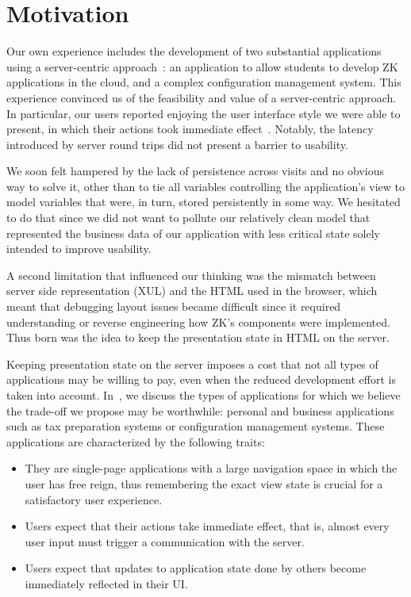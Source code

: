 \section{Motivation}
\label{sec:moti}

Our own experience includes the development of two substantial applications
using a server-centric approach~\cite{tilothesis,EdwardsBack:csc2011}:
an application to allow students to develop ZK applications in the cloud, and
a complex configuration management system.  This experience convinced
us of the feasibility and value of a server-centric approach.  In particular,
our users reported enjoying the user interface style we were able to
present, in which their actions took immediate effect~\cite{BaileyBack:igi2013}.
Notably, the latency introduced by server round trips did not present a
barrier to usability.

We soon felt hampered by the lack of persistence across visits and no obvious way 
to solve it, other than to tie all variables controlling the application's
view to model variables that were, in turn, stored persistently in some way.
We hesitated to do that since we did not want to pollute our relatively clean
model that represented the business data of our application with less 
critical state solely intended to improve usability.

A second limitation that influenced our thinking was the mismatch between
server side representation (XUL) and the HTML used in the browser, which meant
that debugging layout issues became difficult since it required understanding
or reverse engineering how ZK's components were implemented.
Thus born was the idea to keep the presentation state in HTML on the server.

Keeping presentation state on the server imposes a cost that not all
types of applications may be willing to pay, even when the reduced development
effort is taken into account.  In~\cite{mcdaniel2012cloudbrowser}, we
discuss the types of applications for which we believe the trade-off we propose
may be worthwhile: personal and business applications such as tax preparation systems
or configuration management systems.  These applications are characterized by the following
traits:
\begin{itemize}
\item They are single-page applications with a large navigation space in which the
    user has free reign, thus remembering the exact view state is crucial for
    a satisfactory user experience.
\item Users expect that their actions take immediate effect, that is, almost every
    user input must trigger a communication with the server.
\item Users expect that updates to application state done by others become immediately
    reflected in their UI.
\end{itemize}

